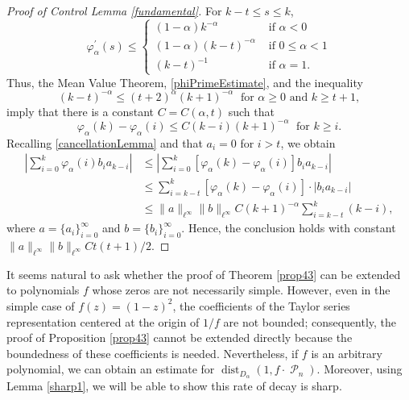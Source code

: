 \documentclass[11 pt,reqno]{amsart}
\theoremstyle{definition}
\theoremstyle{remark}
\numberwithin{equation}{section} \numberwithin{figure}{section}
\DeclareMathOperator{\Pol}{{\mathcal P}}
\DeclareMathOperator{\dist}{dist}
\begin{document}
\begin{proof}[Proof of Control Lemma \ref{fundamental}]
For $k-t\leq s\leq k$,
\begin{equation}\label{phiPrimeEstimate}
            \varphi^{\prime}_{\alpha}(s)\leq\left\{
            \begin{array}{ll}
                        (1-\alpha)k^{-\alpha}\;&\text{ if }\alpha<0\\
                        (1-\alpha)(k-t)^{-\alpha}&\text{ if }0\leq\alpha<1\\
                        (k-t)^{-1}&\text{ if }\alpha=1.
            \end{array}\right.
\end{equation}
Thus, the Mean Value Theorem, \eqref{phiPrimeEstimate}, and the inequality
\[  (k-t)^{-\alpha}\leq(t+2)^{\alpha}(k+1)^{-\alpha}
        \;\text{ for }\alpha\geq0\text{ and }k\geq t+1, \]
imply that there is a constant $C=C(\alpha,t)$ such that
\[  \varphi_{\alpha}(k)-\varphi_{\alpha}(i)\leq C(k-i)(k+1)^{-\alpha}\;\text{ for }k\geq i. \]
Recalling \eqref{cancellationLemma} and that $a_{i}=0$ for $i>t$, we obtain
\begin{align*}
            \left|\sum_{i=0}^k \varphi_{\alpha}(i) b_i a_{k-i}\right|
            &\leq\left|\sum_{i=0}^k [\varphi_{\alpha}(k)-\varphi_{\alpha}(i)] b_i a_{k-i}\right|\\
            &\leq \sum_{i=k-t}^k [\varphi_{\alpha}(k)-\varphi_{\alpha}(i)]\cdot |b_i a_{k-i}|\\
            &\leq\|a\|_{\ell^{\infty}}\|b\|_{\ell^{\infty}}C(k+1)^{-\alpha}\sum_{i=k-t}^k(k-i),
\end{align*}
where $a=\{a_{i}\}_{i=0}^{\infty}$ and $b=\{b_{i}\}_{i=0}^{\infty}$.  Hence, the
conclusion holds with constant $\|a\|_{\ell^{\infty}}\|b\|_{\ell^{\infty}}Ct(t+1)/2$.
\end{proof}

It seems natural to ask whether the proof  of Theorem \ref{prop43} can
be extended to polynomials $f$ whose zeros are not necessarily simple.   However,
even in the simple case of $f(z)=(1-z)^2$, the coefficients of the Taylor series
representation centered at the origin of $1/f$ are not bounded; consequently, the proof of
Proposition \ref{prop43} cannot be extended directly because the boundedness of these
coefficients is needed.  Nevertheless, if $f$ is an arbitrary polynomial, we can obtain an estimate for $\dist_{D_{\alpha}}(1,f\cdot\Pol_{n})$.
Moreover, using Lemma \ref{sharp1}, we will be able to show this rate of decay is sharp.
\end{document}
